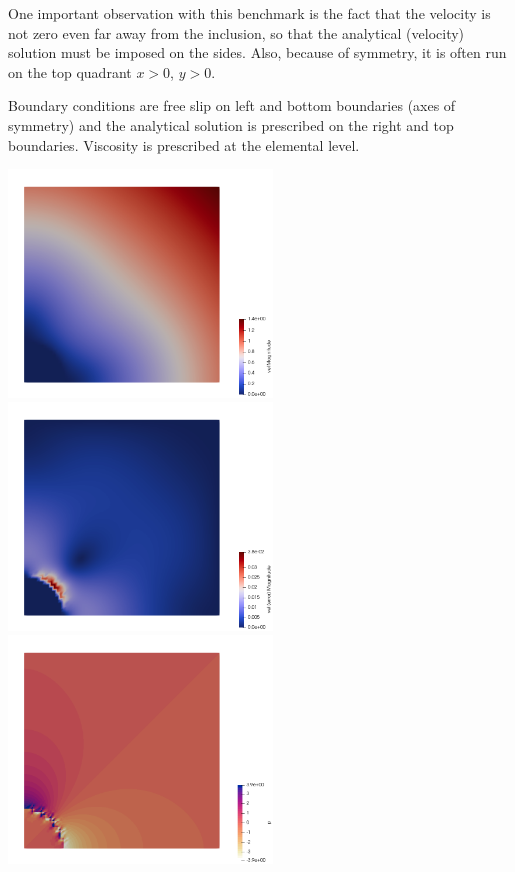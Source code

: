One important observation with this benchmark is the fact that the 
velocity is not zero even far 
away from the inclusion, so that the analytical (velocity) solution must be imposed on the sides.
Also, because of symmetry, it is often run on the top quadrant $x>0$, $y>0$.

Boundary conditions are free slip on left and bottom boundaries (axes of symmetry)
and the analytical solution is prescribed on the right and top boundaries.
Viscosity is prescribed at the elemental level.

\begin{center}
\includegraphics[width=7cm]{python_codes/fieldstone_161/results/bench4/vel}
\includegraphics[width=7cm]{python_codes/fieldstone_161/results/bench4/vel_error}\\
\includegraphics[width=7cm]{python_codes/fieldstone_161/results/bench4/press}

\end{center}
